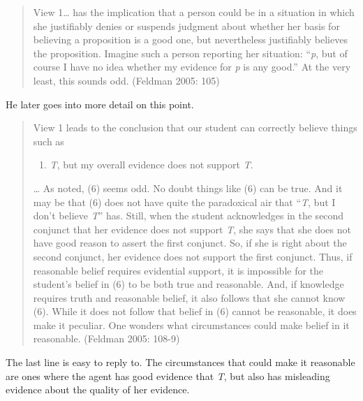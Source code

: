 \documentclass[
  11pt,
  letterpaper,
  DIV=11,
  numbers=noendperiod,
  twoside]{scrartcl}
\providecommand{\tightlist}{%
  \setlength{\itemsep}{0pt}\setlength{\parskip}{0pt}}
\begin{document}
\begin{quote}
View 1\ldots{} has the implication that a person could be in a situation
in which she justifiably denies or suspends judgment about whether her
basis for believing a proposition is a good one, but nevertheless
justifiably believes the proposition. Imagine such a person reporting
her situation: ``\emph{p}, but of course I have no idea whether my
evidence for \emph{p} is any good.'' At the very least, this sounds odd.
(Feldman 2005: 105)
\end{quote}

He later goes into more detail on this point.

\begin{quote}
View 1 leads to the conclusion that our student can correctly believe
things such as

\begin{enumerate}
\def\labelenumi{\arabic{enumi}.}
\setcounter{enumi}{5}
\tightlist
\item
  \emph{T}, but my overall evidence does not support \emph{T}.
\end{enumerate}

\ldots{} As noted, (6) seems odd. No doubt things like (6) can be true.
And it may be that (6) does not have quite the paradoxical air that
``\emph{T}, but I don't believe \emph{T}'' has. Still, when the student
acknowledges in the second conjunct that her evidence does not support
\emph{T}, she says that she does not have good reason to assert the
first conjunct. So, if she is right about the second conjunct, her
evidence does not support the first conjunct. Thus, if reasonable belief
requires evidential support, it is impossible for the student's belief
in (6) to be both true and reasonable. And, if knowledge requires truth
and reasonable belief, it also follows that she cannot know (6). While
it does not follow that belief in (6) cannot be reasonable, it does make
it peculiar. One wonders what circumstances could make belief in it
reasonable. (Feldman 2005: 108-9)
\end{quote}

The last line is easy to reply to. The circumstances that could make it
reasonable are ones where the agent has good evidence that \emph{T}, but
also has misleading evidence about the quality of her evidence.
\end{document}
